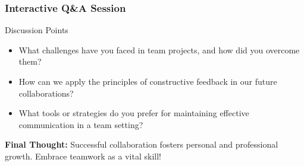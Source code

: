 \documentclass[aspectratio=169]{beamer}
\begin{document}
\begin{frame}[fragile]
    \frametitle{Interactive Q\&A Session}
    \begin{block}{Discussion Points}
        \begin{itemize}
            \item What challenges have you faced in team projects, and how did you overcome them?
            \item How can we apply the principles of constructive feedback in our future collaborations?
            \item What tools or strategies do you prefer for maintaining effective communication in a team setting?
        \end{itemize}
    \end{block}
    
    \textbf{Final Thought:} Successful collaboration fosters personal and professional growth. Embrace teamwork as a vital skill!
\end{frame}
\end{document}
